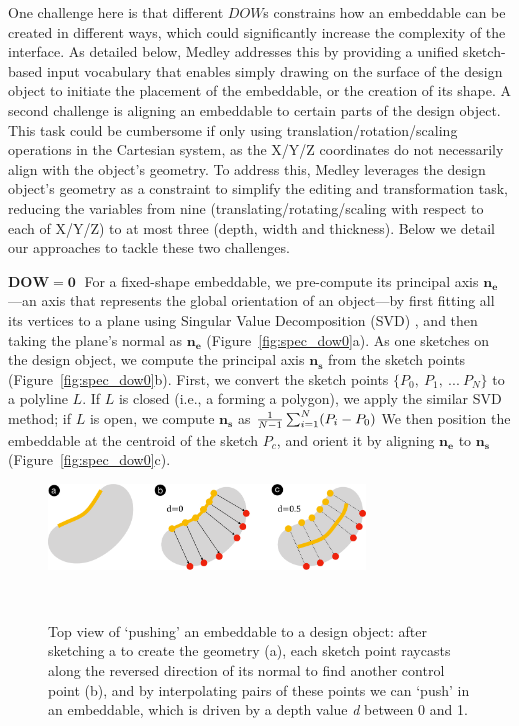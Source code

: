 One challenge here is that different $DOW$s constrains how an embeddable can be created in different ways, which could significantly increase the complexity of the interface. As detailed below, Medley addresses this by providing a unified sketch-based input vocabulary that enables simply drawing on the surface of the design object to initiate the placement of the embeddable, or the creation of its shape. A second challenge is aligning an embeddable to certain parts of the design object. This task could be cumbersome if only using translation/rotation/scaling operations in the Cartesian system, as the X/Y/Z coordinates do not necessarily align with the object's geometry. To address this, Medley leverages the design object's geometry as a constraint to simplify the editing and transformation task, reducing the variables from nine (translating/rotating/scaling with respect to each of X/Y/Z) to at most three (depth, width and thickness). Below we detail our approaches to tackle these two challenges.

$\mathbf{DOW=0} \;$ For a fixed-shape embeddable, we pre-compute its principal axis $\mathbf{n_e}$---an axis that represents the global orientation of an object---by first fitting all its vertices to a plane using Singular Value Decomposition (SVD) \cite{strang2011introduction}, and then taking the plane's normal as $\mathbf{n_e}$ (Figure~\ref{fig:spec_dow0}a). As one sketches on the design object, we compute the principal axis $\mathbf{n_s}$ from the sketch points (Figure~\ref{fig:spec_dow0}b). First, we convert the sketch points $\{P_0,~P_1, ~... ~P_N\}$ to a polyline $L$. If $L$ is closed (i.e., a forming a polygon), we apply the similar SVD method; if $L$ is open, we compute $\mathbf{n_s}$ as ${1 \over {N-1}} \sum^N_{i=1}(P_i - P_0)$
We then position the embeddable at the centroid of the sketch $P_c$, and orient it by aligning $\mathbf{n_e}$ to $\mathbf{n_s}$ (Figure~\ref{fig:spec_dow0}c).

\begin{figure} [t]
  \centering
  \includegraphics[width=0.75\textwidth]{figures/control_points}
  \caption{Top view of `pushing' an embeddable to a design object: after sketching a to create the geometry (a), each sketch point raycasts along the reversed direction of its normal to find another control point (b), and by interpolating pairs of these points we can `push' in an embeddable, which is driven by a depth value \textit{d} between 0 and 1.}~\label{fig:control_points}
\end{figure}

